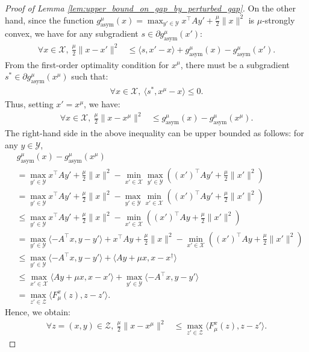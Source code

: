 \documentclass{article}
\newcommand{\X}{\mathcal{X}}
\newcommand{\Y}{\mathcal{Y}}
\newcommand{\Z}{\mathcal{Z}}
\theoremstyle{plain}
\begin{document}
\begin{proof}[Proof of Lemma \ref{lem:upper_bound_on_gap_by_perturbed_gap}]
    On the other hand, since the function $g_{\mathrm{asym}}^{\mu}(x) = \max_{y'\in \Y}x^{\top}Ay' + \frac{\mu}{2}\|x\|^2$ is $\mu$-strongly convex, we have for any subgradient $s \in \partial g_{\mathrm{asym}}^{\mu}(x')$:
    \begin{align*}
        \forall x\in \X, ~\frac{\mu}{2}\| x - x' \|^2 & \leq \langle s, x' - x\rangle + g_{\mathrm{asym}}^{\mu}(x) - g_{\mathrm{asym}}^{\mu}(x').
    \end{align*}
    From the first-order optimality condition for $x^{\mu}$, there must be a subgradient $s^{\ast}\in \partial g_{\mathrm{asym}}^{\mu}(x^{\mu})$ such that:
    \begin{align*}
        \forall x\in \X, ~\langle s^{\ast}, x^{\mu} - x\rangle \leq 0.
    \end{align*}
    Thus, setting $x' = x^{\mu}$, we have:
    \begin{align*}
        \forall x\in \X, ~\frac{\mu}{2}\| x - x^{\mu} \|^2 & \leq g_{\mathrm{asym}}^{\mu}(x) - g_{\mathrm{asym}}^{\mu}(x^{\mu}).
    \end{align*}
    The right-hand side in the above inequality can be upper bounded as follows:
    for any $y\in \Y$,
    \begin{align*}
        & g_{\mathrm{asym}}^{\mu}(x) - g_{\mathrm{asym}}^{\mu}(x^{\mu})                                                                                              \\
        & = \max_{y'\in \Y}x^{\top}Ay' + \frac{\mu}{2}\|x\|^2 - \min_{x'\in \X}\max_{y'\in \Y}\left((x')^{\top}Ay' + \frac{\mu}{2}\|x'\|^2\right)                    \\
        & = \max_{y'\in \Y}x^{\top}Ay' + \frac{\mu}{2}\|x\|^2 - \max_{y'\in \Y}\min_{x'\in \X}\left((x')^{\top}Ay' + \frac{\mu}{2}\|x'\|^2\right)                    \\
        & \leq \max_{y'\in \Y}x^{\top}Ay' + \frac{\mu}{2}\|x\|^2 - \min_{x'\in \X}\left((x')^{\top}Ay + \frac{\mu}{2}\|x'\|^2\right)                                 \\
        & = \max_{y'\in \Y}\langle -A^{\top}x, y - y'\rangle + x^{\top}Ay + \frac{\mu}{2}\|x\|^2 - \min_{x'\in \X}\left((x')^{\top}Ay + \frac{\mu}{2}\|x'\|^2\right) \\
        & \leq \max_{y'\in \Y}\langle -A^{\top}x, y - y'\rangle + \langle Ay + \mu x, x - x^{\dagger}\rangle                                                         \\
        & \leq \max_{x'\in \X} \langle Ay + \mu x, x - x'\rangle + \max_{y'\in \Y}\langle -A^{\top}x, y - y'\rangle                                                  \\
        & = \max_{z'\in \Z}\langle F_{\mu}^x(z), z - z'\rangle.
    \end{align*}
    Hence, we obtain:
    \begin{align}
        \forall z = (x, y)\in \Z, ~\frac{\mu}{2}\| x - x^{\mu} \|^2 & \leq \max_{z'\in \Z}\langle F_{\mu}^x(z), z - z'\rangle.
        \label{eq:lower_bound_on_perturbed_gap_by_distance_from_perturbed_equilbrium}
    \end{align}


\end{proof}
\end{document}
